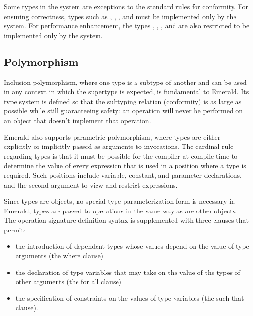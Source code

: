 Some types in the system are exceptions to
the standard rules for conformity.  For ensuring
correctness, types such as
, , ,  and  must
be implemented only by the system. For performance enhancement,
the types
, , , and  are also
restricted to be implemented only by the system.

\subsection{Polymorphism}
\label{polymorphism}
Inclusion polymorphism, where one type is a subtype of another and can be
used in any context in which the supertype is expected, is fundamental to
Emerald.  Its type system is defined so that the subtyping relation
(conformity) is as large as possible while still guaranteeing safety: an
operation will never be performed on an object that doesn't implement that
operation.

Emerald also supports parametric polymorphism, where types are either
explicitly or implicitly passed as arguments to invocations.  The cardinal
rule regarding types is that it must be possible for the compiler at compile
time to determine the value of every expression that is used in a position
where a type is required.  Such positions include variable, constant, and
parameter declarations, and the second argument to view and restrict
expressions.

Since types are objects, no special type parameterization form is necessary
in Emerald; types are passed to operations in the same way as are other
objects.   The operation signature definition syntax is supplemented with
three clauses that permit:
\begin{itemize}
  \item{}  the introduction of dependent types whose values
    depend on the value of type arguments (the where clause)
  \item{} the declaration of type variables that may take on the value of
    the types of other arguments (the for all clause)
  \item{} the specification of constraints on the values of type
    variables (the such that clause).  
\end{itemize}

